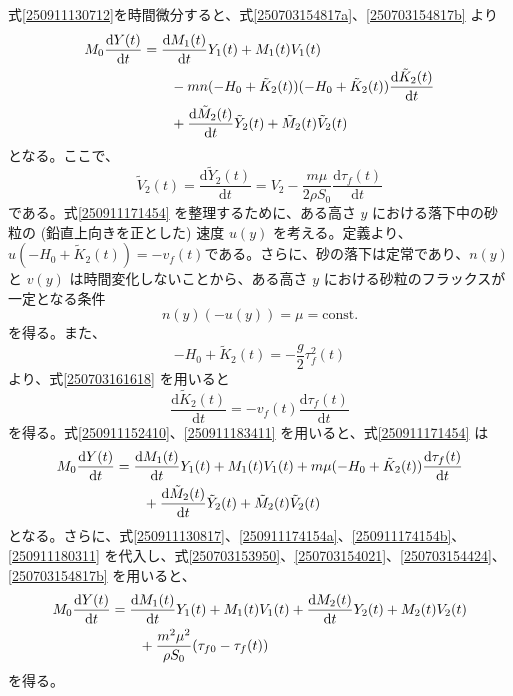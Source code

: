 \documentclass[]{article}
\begin{document}
   


式\eqref{250911130712}を時間微分すると、式\eqref{250703154817a}、\eqref{250703154817b} より
\begin{align} \label{250911171454}
   M_0\frac{\mathrm{d}Y(t)}{\mathrm{d}t} &= \frac{\mathrm{d}M_1(t)}{\mathrm{d}t} Y_1(t) + M_1(t)V_1(t) \notag\\
   &\qquad- m n(-H_0+\tilde{K}_2(t)) (-H_0+\tilde{K}_2(t))\frac{\mathrm{d}\tilde{K}_2(t)}{\mathrm{d}t} \notag\\
   &\qquad+ \frac{\mathrm{d}\tilde{M}_2(t)}{\mathrm{d}t} \tilde{Y}_2(t) + \tilde{M}_2(t)\tilde{V}_2(t)
\end{align}
となる。ここで、
\begin{equation} \label{250911180311}
   \tilde{V}_2(t) = \frac{\mathrm{d}\tilde{Y}_2(t)}{\mathrm{d}t} = V_2 - \frac{m\mu}{2\rho S_0}\frac{\mathrm{d}\tau_f(t)}{\mathrm{d}t}
\end{equation}
である。式\eqref{250911171454} を整理するために、ある高さ $y$ における落下中の砂粒の (鉛直上向きを正とした) 速度 $u(y)$ を考える。定義より、$u(-H_0+\tilde{K}_2(t))=-v_f(t)$である。さらに、砂の落下は定常であり、$n(y)$ と $v(y)$ は時間変化しないことから、ある高さ $y$ における砂粒のフラックスが一定となる条件
\begin{equation} \label{250911152410}
   n(y) (-u(y)) = \mu =\text{const.}
\end{equation}
を得る。また、
\begin{equation} \label{250911151314}
   -H_0+\tilde{K}_2(t) = -\frac{g}{2}\tau_f^2(t)
\end{equation}
より、式\eqref{250703161618} を用いると
\begin{equation} \label{250911183411}
   \frac{\mathrm{d}\tilde{K}_2(t)}{\mathrm{d}t} = -v_f(t)\frac{\mathrm{d}\tau_f(t)}{\mathrm{d}t}
\end{equation}
を得る。式\eqref{250911152410}、\eqref{250911183411} を用いると、式\eqref{250911171454} は
\begin{align} \label{250911183814}
   M_0\frac{\mathrm{d}Y(t)}{\mathrm{d}t} &= \frac{\mathrm{d}M_1(t)}{\mathrm{d}t} Y_1(t) + M_1(t)V_1(t) + m\mu (-H_0+\tilde{K}_2(t))\frac{\mathrm{d}\tau_f(t)}{\mathrm{d}t} \notag\\
   &\qquad+ \frac{\mathrm{d}\tilde{M}_2(t)}{\mathrm{d}t} \tilde{Y}_2(t) + \tilde{M}_2(t)\tilde{V}_2(t)
\end{align}
となる。さらに、式\eqref{250911130817}、\eqref{250911174154a}、\eqref{250911174154b}、\eqref{250911180311} を代入し、式\eqref{250703153950}、\eqref{250703154021}、\eqref{250703154424}、\eqref{250703154817b} を用いると、
\begin{align} \label{250911193832}
   M_0\frac{\mathrm{d}Y(t)}{\mathrm{d}t} &= \frac{\mathrm{d}M_1(t)}{\mathrm{d}t} Y_1(t) + M_1(t)V_1(t) + \frac{\mathrm{d}M_2(t)}{\mathrm{d}t} Y_2(t) + M_2(t)V_2(t) \notag\\
   &\qquad+\frac{m^2\mu^2}{\rho S_0}(\tau_{f0}-\tau_f(t))
\end{align}
を得る。
\end{document}
